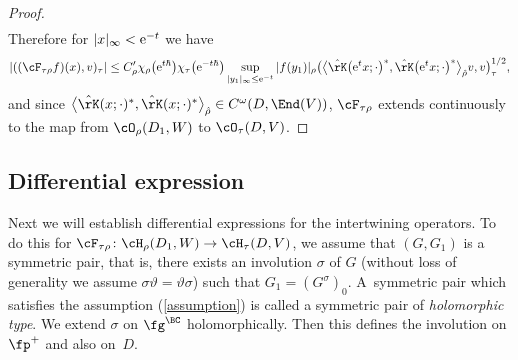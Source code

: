\begin{proof}
\begin{align*}
\end{align*}
Therefore for $|x|_\infty<{\rm e}^{-t}$ we have
\begin{gather*}
 |((\cF_{\tau\rho}f)(x),v)_\tau|
\le C_\rho'\chi_\rho\big({\rm e}^{t\hbar}\big)\chi_\tau\big({\rm e}^{-t\hbar}\big)\sup_{|y_1|_\infty\le {\rm e}^{-t}}|f(y_1)|_\rho
\big(\big\langle\hat{\rK}\big({\rm e}^tx;\cdot\big)^*,\hat{\rK}\big({\rm e}^tx;\cdot\big)^*\big\rangle_{\hat{\rho}}v,v\big)_\tau^{1/2},
\end{gather*}
and since $\big\langle\hat{\rK}(x;\cdot)^*,\hat{\rK}(x;\cdot)^*\big\rangle_{\hat{\rho}}\in C^\omega(D,\End(V))$,
$\cF_{\tau\rho}$ extends continuously to the map from $\cO_\rho(D_1,W)$ to $\cO_\tau(D,V)$.
\end{proof}

\subsection{Differential expression}
Next we will establish differential expressions for the intertwining operators.
To do this for $\cF_{\tau\rho}\colon \cH_\rho(D_1,W)\to \cH_\tau(D,V)$, we assume that $(G,G_1)$ is a symmetric pair, that is,
there exists an involution $\sigma$ of $G$ (without loss of generality we assume $\sigma\vartheta=\vartheta\sigma$) such that $G_1=(G^\sigma)_0$.
A~symmetric pair which satisfies the assumption (\ref{assumption}) is called a symmetric pair of \textit{holomorphic type}.
We extend $\sigma$ on $\fg^\BC$ holomorphically. Then this defines the involution on $\fp^+$ and also on~$D$.

